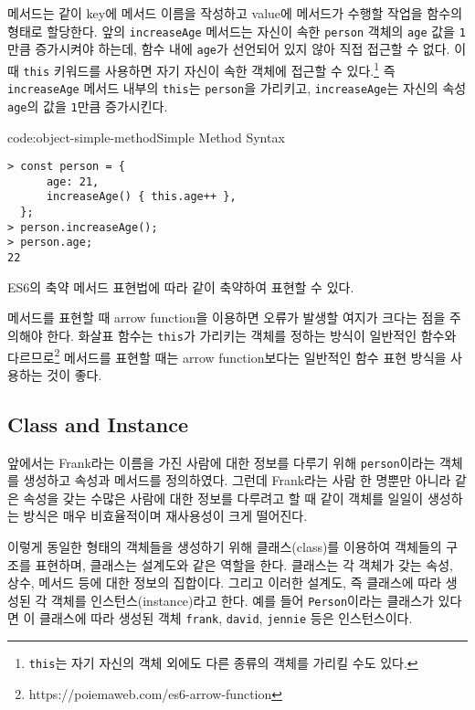 메서드는 \와 같이 key에 메서드 이름을 작성하고 value에 메서드가 수행할 작업을 함수의 형태로 할당한다. 앞의 \texttt{increaseAge} 메서드는 자신이 속한 \texttt{person} 객체의 \texttt{age} 값을 \texttt{1}만큼 증가시켜야 하는데, 함수 내에 \texttt{age}가 선언되어 있지 않아 직접 접근할 수 없다. 이때 \texttt{this} 키워드를 사용하면 자기 자신이 속한 객체에 접근할 수 있다.\footnote{\texttt{this}는 자기 자신의 객체 외에도 다른 종류의 객체를 가리킬 수도 있다.} 즉 \texttt{increaseAge} 메서드 내부의 \texttt{this}는 \texttt{person}을 가리키고, \texttt{increaseAge}는 자신의 속성 \texttt{age}의 값을 \texttt{1}만큼 증가시킨다.

\begin{codeenv}{code:object-simple-method}{Simple Method Syntax}\begin{verbatim}
> const person = {
      age: 21,
      increaseAge() { this.age++ },
  };
> person.increaseAge();
> person.age;
22
\end{verbatim}
\end{codeenv}

ES6의 축약 메서드 표현법에 따라 \와 같이 축약하여 표현할 수 있다.

메서드를 표현할 때 arrow function을 이용하면 오류가 발생할 여지가 크다는 점을 주의해야 한다. 화살표 함수는 \texttt{this}가 가리키는 객체를 정하는 방식이 일반적인 함수와 다르므로\footnote{https://poiemaweb.com/es6-arrow-function} 메서드를 표현할 때는 arrow function보다는 일반적인 함수 표현 방식을 사용하는 것이 좋다.

\subsection*{Class and Instance}

앞에서는 Frank라는 이름을 가진 사람에 대한 정보를 다루기 위해 \texttt{person}이라는 객체를 생성하고 속성과 메서드를 정의하였다. 그런데 Frank라는 사람 한 명뿐만 아니라 같은 속성을 갖는 수많은 사람에 대한 정보를 다루려고 할 때 \와 같이 객체를 일일이 생성하는 방식은 매우 비효율적이며 재사용성이 크게 떨어진다.

이렇게 동일한 형태의 객체들을 생성하기 위해 클래스(class)를 이용하여 객체들의 구조를 표현하며, 클래스는 설계도와 같은 역할을 한다. 클래스는 각 객체가 갖는 속성, 상수, 메서드 등에 대한 정보의 집합이다. 그리고 이러한 설계도, 즉 클래스에 따라 생성된 각 객체를 인스턴스(instance)라고 한다. 예를 들어 \texttt{Person}이라는 클래스가 있다면 이 클래스에 따라 생성된 객체 \texttt{frank}, \texttt{david}, \texttt{jennie} 등은 인스턴스이다.

